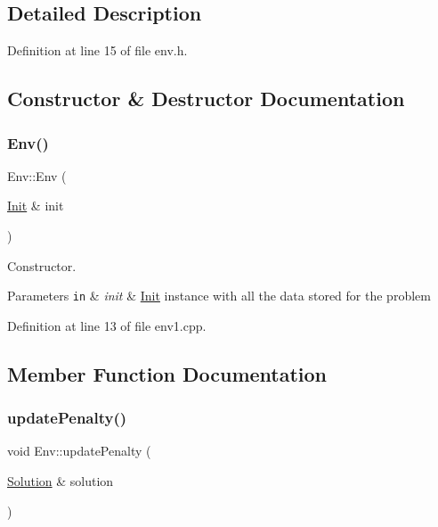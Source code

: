 \subsection{Detailed Description}


Definition at line 15 of file env.\+h.



\subsection{Constructor \& Destructor Documentation}
\mbox{\label{class_env_abef807205f56ffe87706b5413c0de75f}} 
\subsubsection{\texorpdfstring{Env()}{Env()}}
{\footnotesize\ttfamily Env\+::\+Env (\begin{DoxyParamCaption}\item[{\hyperlink{class_init}{Init} \&}]{init }\end{DoxyParamCaption})}



Constructor. 


\begin{DoxyParams}[1]{Parameters}
\mbox{\tt in}  & {\em init} & \hyperlink{class_init}{Init} instance with all the data stored for the problem \\
\hline
\end{DoxyParams}


Definition at line 13 of file env1.\+cpp.



\subsection{Member Function Documentation}
\mbox{\label{class_env_a05decf6ad0f2370b38fd8c403777a9ca}} 
\subsubsection{\texorpdfstring{update\+Penalty()}{updatePenalty()}}
{\footnotesize\ttfamily void Env\+::update\+Penalty (\begin{DoxyParamCaption}\item[{\hyperlink{class_solution}{Solution} \&}]{solution }\end{DoxyParamCaption})}




